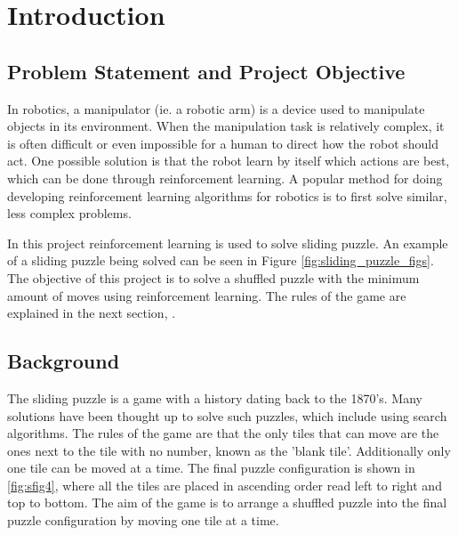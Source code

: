 \graphicspath{{introduction/fig/}}

\chapter{Introduction}
\label{chap:introduction}

\section{Problem Statement and Project Objective}
In robotics, a manipulator (ie. a robotic arm) is a device used to manipulate objects in its environment. When the manipulation task is relatively complex, it is often difficult or even impossible for a human to direct how the robot should act. One possible solution is that the robot learn by itself which actions are best, which can be done through reinforcement learning. A popular method for doing developing reinforcement learning algorithms for robotics is to first solve similar, less complex problems.

In this project reinforcement learning is used to solve sliding puzzle. An example of a sliding puzzle being solved can be seen in Figure \ref{fig:sliding_puzzle_figs}. The objective of this project is to solve a shuffled puzzle with the minimum amount of moves using reinforcement learning. The rules of the game are explained in the next section, . 

\section{Background}

The sliding puzzle is a game with a history dating back to the 1870's. Many solutions have been thought up to solve such puzzles, which include using search algorithms\cite{search_alg}. The rules of the game are that the only tiles that can move are the ones next to the tile with no number, known as the 'blank tile'. Additionally only one tile can be moved at a time. The final puzzle configuration is shown in \ref{fig:sfig4}, where all the tiles are placed in ascending order read left to right and top to bottom. The aim of the game is to arrange a shuffled puzzle into the final puzzle configuration by moving one tile at a time.

